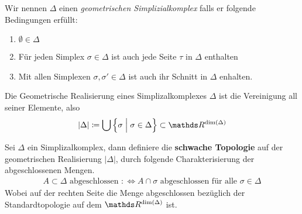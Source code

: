\begin{Def}
  Wir nennen $\Delta$ einen \textit{geometrischen Simplizialkomplex}
  falls er folgende Bedingungen erfüllt:
  \begin{enumerate}[(K1)]
  \item $\emptyset \in \Delta$
  \item Für jeden Simplex $\sigma \in \Delta$ ist auch jede Seite
    $\tau$ in $\Delta$ enthalten
  \item Mit allen Simplexen $\sigma, \sigma' \in \Delta$ ist auch ihr
    Schnitt in $\Delta$ enhalten.
  \end{enumerate}
\end{Def}



\begin{Def}
  Die Geometrische Realisierung eines Simplizalkomplexes $\Delta$ ist
  die Vereinigung all seiner Elemente, also
  \begin{gather*}
    |\Delta| \coloneqq \bigcup \left\{ \sigma \; \Big| \; \sigma \in
      \Delta \right\} \subset \R^{\dim(\Delta)}
  \end{gather*}
\end{Def}

\begin{Def}
  Sei $\Delta$ ein Simplizalkomplex, dann definiere die
  \textbf{schwache Topologie} auf der geometrischen Realisierung $| \Delta |$,
  durch folgende Charakterisierung der abgeschlossenen Mengen.
  \begin{gather*}
    A \subset \Delta \text{ abgeschlossen } :\Leftrightarrow A \cap
    \sigma \text{ abgeschlossen für alle } \sigma \in \Delta
  \end{gather*}
  Wobei auf der rechten Seite die Menge abgeschlossen bezüglich der
  Standardtopologie auf dem $\R^{\dim(\Delta)}$ ist.
\end{Def}

